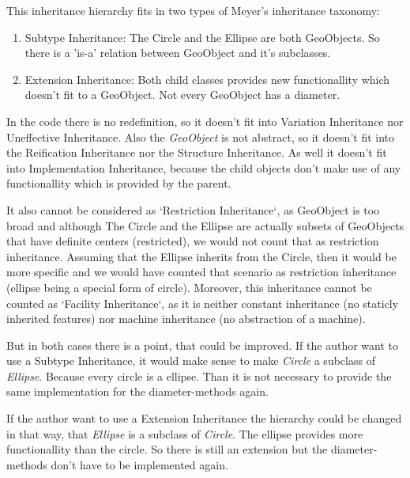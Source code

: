 \documentclass[a4paper,12pt,oneside]{scrreprt}
\begin{document}
    \begin{flushleft}
        This inheritance hierarchy fits in two types of Meyer's inheritance taxonomy:
        \begin{enumerate}
            \item Subtype Inheritance: The Circle and the Ellipse are both GeoObjects. So there is a 'is-a' relation between GeoObject and it's subclasses.
            \item Extension Inheritance: Both child classes provides new functionallity which doesn't fit to a GeoObject. Not every GeoObject has a diameter.
        \end{enumerate}
    
        In the code there is no redefinition, so it doesn't fit into Variation Inheritance nor Uneffective Inheritance. Also the \textit{GeoObject} is not abstract, so it doesn't fit into the Reification Inheritance nor the Structure Inheritance. As well it doesn't fit into Implementation Inheritance, because the child objects don't make use of any functionallity which is provided by the parent.
        
        It also cannot be considered as `Restriction Inheritance`, as GeoObject is too broad and although The Circle and the Ellipse are actually subsets of GeoObjects that have definite centers (restricted), we would not count that as restriction inheritance. Assuming that the Ellipse inherits from the Circle, then it would be more specific and we would have counted that scenario as restriction inheritance (ellipse being a special form of circle). Moreover, this inheritance cannot be counted as `Facility Inheritance`, as it is neither constant inheritance (no staticly inherited features) nor machine inheritance (no abstraction of a machine).
        
        But in both cases there is a point, that could be improved. If the author want to use a Subtype Inheritance, it would make sense to make \textit{Circle} a subclass of \textit{Ellipse}. Because every circle is a ellipse. Than it is not necessary to provide the same implementation for the diameter-methods again.
        
        If the author want to use a Extension Inheritance the hierarchy could be changed in that way, that \textit{Ellipse} is a subclass of \textit{Circle}. The ellipse provides more functionallity than the circle. So there is still an extension but the diameter-methods don't have to be implemented again.
    \end{flushleft}
	
\end{document}
